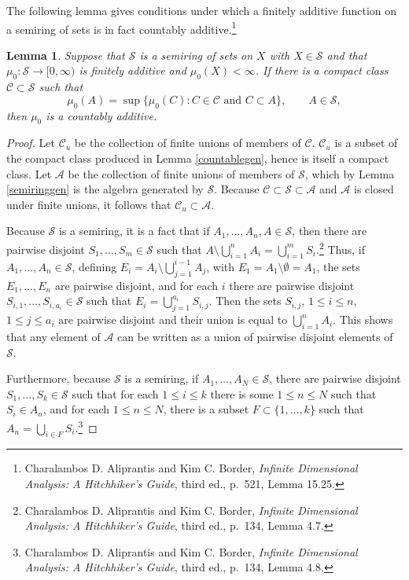\documentclass{article}
\newtheorem{lemma}[theorem]{Lemma}
\theoremstyle{definition}
\begin{document}
The following lemma gives conditions under which a finitely additive function on a semiring of sets is in fact countably additive.\footnote{Charalambos D. 
Aliprantis and Kim C. Border, {\em Infinite Dimensional Analysis: A Hitchhiker's Guide}, third ed., p.~521,
Lemma 15.25.} 


\begin{lemma}
Suppose that $\mathscr{S}$ is a semiring of sets on $X$ with $X \in \mathscr{S}$ and
that $\mu_0:\mathscr{S} \to [0,\infty)$
is finitely additive and $\mu_0(X)<\infty$. If there is a compact class $\mathscr{C} \subset \mathscr{S}$ such that
\[
\mu_0(A) = \sup\{\mu_0(C) : \textrm{$C \in \mathscr{C}$ and $C \subset A$}\}, \qquad A \in \mathscr{S},
\]
then $\mu_0$ is a countably additive.
\label{neveu}
\end{lemma}
\begin{proof}
Let $\mathscr{C}_u$ be the collection of finite unions of members of $\mathscr{C}$. $\mathscr{C}_u$ is a subset of the compact class
produced in Lemma \ref{countablegen}, hence is itself a compact class. Let $\mathscr{A}$ be the collection of finite unions of members of $\mathscr{S}$, which
 by Lemma \ref{semiringgen} is the algebra generated by $\mathscr{S}$. 
Because $\mathscr{C} \subset \mathscr{S} \subset \mathscr{A}$ and $\mathscr{A}$ is closed under
finite unions, it follows that $\mathscr{C}_u \subset \mathscr{A}$. 

Because $\mathscr{S}$ is a semiring, it is a fact that if $A_1,\ldots,A_n,A \in \mathscr{S}$, then there are pairwise disjoint $S_1,\ldots,S_m \in \mathscr{S}$
such that $A \setminus \bigcup_{i=1}^n A_i = \bigcup_{i=1}^m S_i$.\footnote{Charalambos D. 
Aliprantis and Kim C. Border, {\em Infinite Dimensional Analysis: A Hitchhiker's Guide}, third ed., p.~134,
Lemma 4.7.} Thus, if $A_1,\ldots,A_n \in \mathscr{S}$, defining $E_i = A_i \setminus \bigcup_{j=1}^{i-1} A_j$, with $E_1=A_1 \setminus \emptyset =A_1$,
 the sets $E_1,\ldots,E_n$ are pairwise disjoint, and for each $i$ there are pairwise disjoint $S_{i,1},\ldots,S_{i,a_i} \in \mathscr{S}$ 
such that $E_i = \bigcup_{j=1}^{a_i} S_{i,j}$. Then the sets $S_{i,j}$, $1 \leq i \leq n$, $1 \leq j \leq a_i$ are pairwise disjoint and their
union is equal to $\bigcup_{i=1}^n A_i$. This shows that any element of $\mathscr{A}$ can be written as a union of pairwise disjoint elements of $\mathscr{S}$.


Furthermore, because $\mathscr{S}$ is a semiring, if $A_1,\ldots,A_N \in \mathscr{S}$, there are pairwise disjoint
$S_1,\ldots,S_k \in \mathscr{S}$ such that for each $1 \leq i \leq k$ there is some $1 \leq n \leq N$ such that
$S_i \in A_n$, and for each $1 \leq n \leq N$, there is a subset $F \subset \{1,\ldots,k\}$ such that
$A_n = \bigcup_{i \in F} S_i$.\footnote{Charalambos D. 
Aliprantis and Kim C. Border, {\em Infinite Dimensional Analysis: A Hitchhiker's Guide}, third ed., p.~134,
Lemma 4.8.}


\end{proof}
\end{document}

